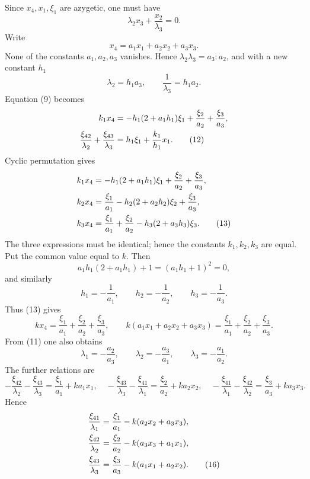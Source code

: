 \documentclass[11pt]{article}
\begin{document}
Since \(x_4,x_1,\xi_1\) are azygetic, one must have
\[
 \lambda_2x_3+\frac{x_2}{\lambda_3}=0.
\]
Write
\begin{equation}
 x_4=a_1x_1+a_2x_2+a_3x_3.
 \tag{10}
\end{equation}
None of the constants \(a_1,a_2,a_3\) vanishes. Hence \(\lambda_2\lambda_3=a_3:a_2\), and with a new constant \(h_1\)
\begin{equation}
 \lambda_2=h_1a_3,
 \qquad
 \frac1{\lambda_3}=h_1a_2.
 \tag{11}
\end{equation}
Equation (9) becomes
\begin{align}
 k_1x_4&=-h_1(2+a_1h_1)\xi_1+\frac{\xi_2}{a_2}+\frac{\xi_3}{a_3},\notag\\
 \frac{\xi_{42}}{\lambda_2}+\frac{\xi_{43}}{\lambda_3}&=h_1\xi_1+\frac{k_1}{h_1}x_1.
 \tag{12}
\end{align}
Cyclic permutation gives
\begin{align}
 k_1x_4&=-h_1(2+a_1h_1)\xi_1+\frac{\xi_2}{a_2}+\frac{\xi_3}{a_3},
\notag\\
 k_2x_4&=\frac{\xi_1}{a_1}-h_2(2+a_2h_2)\xi_2+\frac{\xi_3}{a_3},
\notag\\
 k_3x_4&=\frac{\xi_1}{a_1}+\frac{\xi_2}{a_2}-h_3(2+a_3h_3)\xi_3.
 \tag{13}
\end{align}
The three expressions must be identical; hence the constants \(k_1,k_2,k_3\) are equal. Put the common value equal to \(k\). Then
\[
 a_1h_1(2+a_1h_1)+1=(a_1h_1+1)^2=0,
\]
and similarly
\begin{equation}
 h_1=-\frac1{a_1},\qquad h_2=-\frac1{a_2},\qquad h_3=-\frac1{a_3}.
 \tag{13b}
\end{equation}
Thus (13) gives
\begin{equation}
 kx_4=\frac{\xi_1}{a_1}+\frac{\xi_2}{a_2}+\frac{\xi_3}{a_3},
 \qquad
 k(a_1x_1+a_2x_2+a_3x_3)=\frac{\xi_1}{a_1}+\frac{\xi_2}{a_2}+\frac{\xi_3}{a_3}.
 \tag{14}
\end{equation}
From (11) one also obtains
\begin{equation}
 \lambda_1=-\frac{a_2}{a_3},
 \qquad
 \lambda_2=-\frac{a_3}{a_1},
 \qquad
 \lambda_3=-\frac{a_1}{a_2}.
 \tag{15}
\end{equation}
The further relations are
\[
 -\frac{\xi_{42}}{\lambda_2}-\frac{\xi_{43}}{\lambda_3}=\frac{\xi_1}{a_1}+ka_1x_1,
\quad
 -\frac{\xi_{43}}{\lambda_3}-\frac{\xi_{41}}{\lambda_1}=\frac{\xi_2}{a_2}+ka_2x_2,
\quad
 -\frac{\xi_{41}}{\lambda_1}-\frac{\xi_{42}}{\lambda_2}=\frac{\xi_3}{a_3}+ka_3x_3.
\]
Hence
\begin{align}
 \frac{\xi_{41}}{\lambda_1}&=\frac{\xi_1}{a_1}-k(a_2x_2+a_3x_3),\notag\\
 \frac{\xi_{42}}{\lambda_2}&=\frac{\xi_2}{a_2}-k(a_3x_3+a_1x_1),\notag\\
 \frac{\xi_{43}}{\lambda_3}&=\frac{\xi_3}{a_3}-k(a_1x_1+a_2x_2).
 \tag{16}
\end{align}
\end{document}
